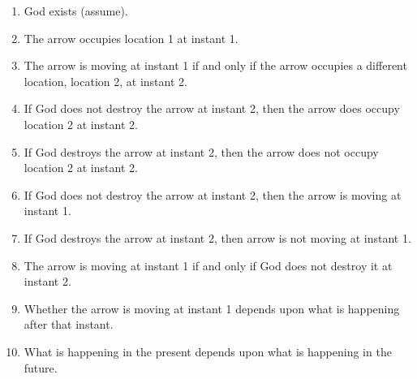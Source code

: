 \documentclass[oneside]{article}
\begin{document}
\begin{enumerate}
\item God exists (assume).
\item The arrow occupies location 1 at instant 1.
\item The arrow is moving at instant 1 if and only if the arrow occupies a different location, location 2, at instant 2. 
\item If God does not destroy the arrow at instant 2, then the arrow does occupy location 2 at instant 2. 
\item If God destroys the arrow at instant 2, then the arrow does not occupy location 2 at instant 2.
\item If God does not destroy the arrow at instant 2, then the arrow is moving at instant 1. 
\item If God destroys the arrow at instant 2, then arrow is not moving at instant 1.
\item The arrow is moving at instant 1 if and only if God does not destroy it at instant 2. 
\item Whether the arrow is moving at instant 1 depends upon what is happening after that instant. 
\item What is happening in the present depends upon what is happening in the future. 
\end{enumerate}
\end{document}
